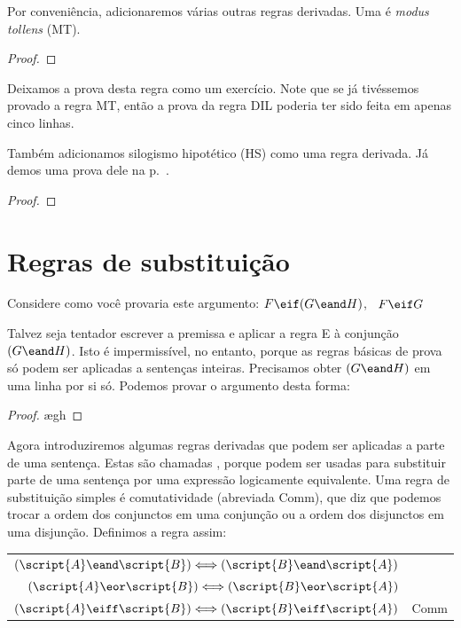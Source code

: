 Por conveniência, adicionaremos várias outras regras derivadas. Uma é \emph{modus tollens} (MT).

\begin{proof}
	 
\end{proof}

Deixamos a prova desta regra como um exercício. Note que se já tivéssemos provado a regra MT, então a prova da regra DIL poderia ter sido feita em apenas cinco linhas.

Também adicionamos silogismo hipotético (HS) como uma regra derivada. Já demos uma prova dele na p.~\pageref{HSproof}.

\begin{proof}
\end{proof}


\section{Regras de substituição}
Considere como você provaria este argumento: $F\eif(G\eand H)$, \therefore\ $F\eif G$

Talvez seja tentador escrever a premissa e aplicar a regra {\eand}E à conjunção $(G \eand H)$. Isto é impermissível, no entanto, porque as regras básicas de prova só podem ser aplicadas a sentenças inteiras. Precisamos obter $(G \eand H)$ em uma linha por si só. Podemos provar o argumento desta forma:

\begin{proof}
	\open
		\ae{gh}
	\close
\end{proof}

Agora introduziremos algumas regras derivadas que podem ser aplicadas a parte de uma sentença. Estas são chamadas , porque podem ser usadas para substituir parte de uma sentença por uma expressão logicamente equivalente. Uma regra de substituição simples é comutatividade (abreviada Comm), que diz que podemos trocar a ordem dos conjunctos em uma conjunção ou a ordem dos disjunctos em uma disjunção. Definimos a regra assim:

\begin{center}
\begin{tabular}{rl}
$(\script{A}\eand\script{B}) \Longleftrightarrow (\script{B}\eand\script{A})$\\
$(\script{A}\eor\script{B}) \Longleftrightarrow (\script{B}\eor\script{A})$\\
$(\script{A}\eiff\script{B}) \Longleftrightarrow (\script{B}\eiff\script{A})$
& Comm
\end{tabular}
\end{center}

